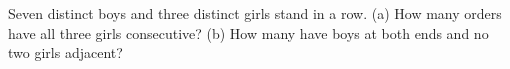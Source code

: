 Seven distinct boys and three distinct girls stand in a row. (a) How many orders have all three girls consecutive? (b) How many have boys at both ends and no two girls adjacent?
